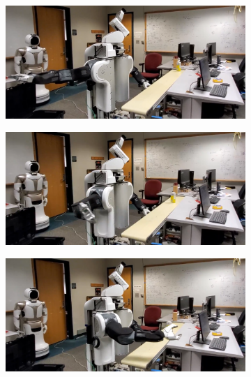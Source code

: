 \documentclass[a4paper]{report}
\begin{document}
\begin{figure}[t]
    \centering
    \begin{subfigure}{0.48\textwidth}
         \includegraphics[trim=0 0 400 0, clip, width=\textwidth]{1}
        \caption{}
        \label{fig:demo1}
    \end{subfigure}
    \hspace{2mm}
    \begin{subfigure}{0.48\textwidth}
         \includegraphics[trim=0 0 400 0, clip, width=\textwidth]{2}
        \caption{}
        \label{fig:demo2}
    \end{subfigure}
    \begin{subfigure}{0.48\textwidth}
         \includegraphics[trim=0 0 400 0, clip, width=\textwidth]{3}

\end{subfigure}
\end{figure}
\end{document}
